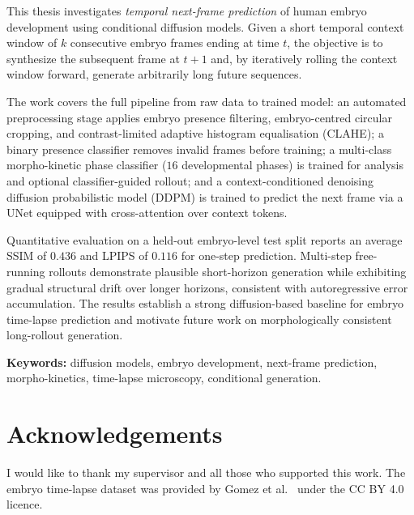 \documentclass[12pt, a4paper, twoside]{report}
\begin{document}
This thesis investigates \emph{temporal next-frame prediction} of human embryo
development using conditional diffusion models.
Given a short temporal context window of $k$ consecutive embryo frames ending
at time $t$, the objective is to synthesize the subsequent frame at $t{+}1$
and, by iteratively rolling the context window forward, generate arbitrarily
long future sequences.

The work covers the full pipeline from raw data to trained model:
an automated preprocessing stage applies embryo presence filtering, embryo-centred
circular cropping, and contrast-limited adaptive histogram equalisation (CLAHE);
a binary presence classifier removes invalid frames before training;
a multi-class morpho-kinetic phase classifier ($16$ developmental phases) is
trained for analysis and optional classifier-guided rollout;
and a context-conditioned denoising diffusion probabilistic model (DDPM) is
trained to predict the next frame via a UNet equipped with cross-attention over
context tokens.

Quantitative evaluation on a held-out embryo-level test split reports an
average SSIM of $0.436$ and LPIPS of $0.116$ for one-step prediction.
Multi-step free-running rollouts demonstrate plausible short-horizon generation
while exhibiting gradual structural drift over longer horizons, consistent with
autoregressive error accumulation.
The results establish a strong diffusion-based baseline for embryo time-lapse
prediction and motivate future work on morphologically consistent long-rollout
generation.

\bigskip
\noindent\textbf{Keywords:} diffusion models, embryo development, next-frame
prediction, morpho-kinetics, time-lapse microscopy, conditional generation.

\cleardoublepage

\chapter*{Acknowledgements}

I would like to thank my supervisor and all those who supported this work.
The embryo time-lapse dataset was provided by Gomez et al.~\cite{gomez2022}
under the CC BY 4.0 licence.

\cleardoublepage

\tableofcontents
\cleardoublepage

\listoffigures
{}
\cleardoublepage
\end{document}

